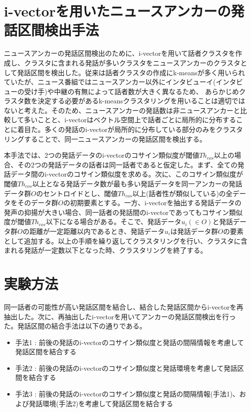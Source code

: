 

\section{i-vectorを用いたニュースアンカーの発話区間検出手法\cite{nozaki_gakuseikai}}
\label{section:clustering}
ニュースアンカーの発話区間検出のために、i-vectorを用いて話者クラスタを作成し、クラスタに含まれる発話が多いクラスタをニュースアンカーのクラスタとして発話区間を検出した。従来は話者クラスタの作成にk-meansが多く用いられていたが、ニュース番組ではニュースアンカー以外にインタビューイ(インタビューの受け手)や中継の有無によって話者数が大きく異なるため、
あらかじめクラスタ数を決定する必要があるk-meansクラスタリングを用いることは適切ではないと考えた。そのため、ニュースアンカーの発話数は非ニュースアンカーと比較して多いことと、i-vectorはベクトル空間上で話者ごとに局所的に分布することに着目た。多くの発話のi-vectorが局所的に分布している部分のみをクラスタリングすることで、同一ニュースアンカーの発話区間を検出する。\par
本手法では、2つの発話データのi-vectorのコサイン類似度が閾値$Th_{cos}$以上の場合、その2つの発話データの話者は同一話者であると仮定した。まず、全ての発話データ間のi-vectorのコサイン類似度を求める。次に、このコサイン類似度が閾値$Th_{cos}$以上となる発話データ数が最も多い発話データを同一アンカーの発話データ群$O$のセントロイドとし、閾値$Th_{cos}$以上(話者性が類似している)の全データをそのデータ群$O$の初期要素とする。一方、i-vectorを抽出する発話データの発声の抑揚が大きい場合、同一話者の発話間のi-vectorであってもコサイン類似度が閾値$Th_{cos}$以下になる場合がある。そこで、発話データ$u_i(\in O)$と発話データ群$O$の距離が一定距離以内であるとき、発話データ$u_i$は発話データ群$O$の要素として追加する。以上の手順を繰り返してクラスタリングを行い、クラスタに含まれる発話が一定数以下となった時、クラスタリングを終了する。\par

\section{実験方法}
同一話者の可能性が高い発話区間を結合し、結合した発話区間からi-vectorを再抽出した。次に、再抽出したi-vectorを用いてアンカーの発話区間検出を行った。発話区間の結合手法は以下の通りである。

\begin{itemize}
\item 手法1 : 前後の発話のi-vectorのコサイン類似度と発話の間隔情報を考慮して発話区間を結合する
\item 手法2 : 前後の発話のi-vectorのコサイン類似度と発話環境を考慮して発話区間を結合する
\item 手法3 : 前後の発話のi-vectorのコサイン類似度と発話の間隔情報(手法1)、および発話環境(手法2)を考慮して発話区間を結合する
\end{itemize}

